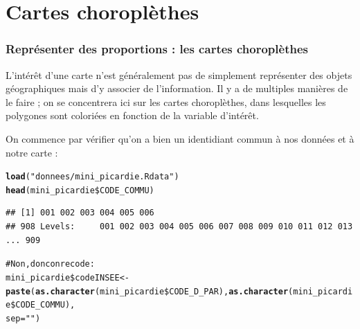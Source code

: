 \documentclass[slidetop, 10pt]{beamer}\usepackage{graphicx, color}
\makeatletter
\newcommand{\hlfunctioncall}[1]{\textcolor[rgb]{0.501960784313725,0,0.329411764705882}{\textbf{#1}}}%
\newcommand{\hlstring}[1]{\textcolor[rgb]{0.6,0.6,1}{#1}}%
\newcommand{\hlcomment}[1]{\textcolor[rgb]{0.180392156862745,0.6,0.341176470588235}{#1}}%
\newenvironment{kframe}{%
 \def\at@end@of@kframe{}%
 \ifinner\ifhmode%
  \def\at@end@of@kframe{\end{minipage}}%
  \begin{minipage}{\columnwidth}%
 \fi\fi%
 \def\FrameCommand##1{\hskip\@totalleftmargin \hskip-\fboxsep
 \colorbox{shadecolor}{##1}\hskip-\fboxsep
     \hskip-\linewidth \hskip-\@totalleftmargin \hskip\columnwidth}%
 \MakeFramed {\advance\hsize-\width
   \@totalleftmargin\z@ \linewidth\hsize
   \@setminipage}}%
 {\par\unskip\endMakeFramed%
 \at@end@of@kframe}
\newenvironment{knitrout}{}{} %
\renewenvironment{knitrout}{\begin{tiny}}{\end{tiny}}
\makeatother
\begin{document}
\section{Cartes choroplèthes}
\begin{frame}[fragile]
\frametitle{Représenter des proportions : les cartes choroplèthes}

L'intérêt d'une carte n'est généralement pas de simplement représenter des objets géographiques mais d'y associer de l'information. Il y a de multiples manières de le faire ; on se concentrera ici sur les cartes choroplèthes, dans lesquelles les polygones sont coloriées en fonction de la variable d'intérêt.

On commence par vérifier qu'on a bien un identidiant commun à nos données et à notre carte :

\begin{knitrout}\tiny
{}\color{fgcolor}\begin{kframe}
\begin{alltt}
\hlfunctioncall{load}(\hlstring{"donnees/mini_picardie.Rdata"})
\hlfunctioncall{head}(mini_picardie\$CODE_COMMU)
\end{alltt}
\begin{verbatim}
## [1] 001 002 003 004 005 006
## 908 Levels:     001 002 003 004 005 006 007 008 009 010 011 012 013 ... 909
\end{verbatim}
\begin{alltt}
\hlcomment{# Non, donc on recode :}
mini_picardie\$codeINSEE <- \hlfunctioncall{paste}(\hlfunctioncall{as.character}(mini_picardie\$CODE_D_PAR), \hlfunctioncall{as.character}(mini_picardie\$CODE_COMMU), 
    sep = \hlstring{""})
\end{alltt}
\end{kframe}
\end{knitrout}


\end{frame}
\end{document}
